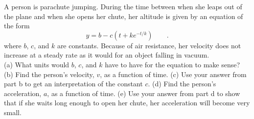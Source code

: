  A person is parachute jumping. During the
time between when she leaps out of the plane and when she
opens her chute, her altitude is given by an equation of the form
\begin{equation*}
      y = b - c\left(t+ke^{-t/k}\right) \qquad .
\end{equation*}
where  $b$, $c$, and
$k$ are constants. Because of air resistance, her velocity
does not increase at a steady rate as it would for an
object falling in vacuum.\\
(a) What units would $b$, $c$, and $k$ have to have for the
equation to make sense?\hwendpart
(b) Find the person's velocity, $v$, as a function of time.\answercheck\hwendpart
(c) Use your answer from part b to get an interpretation
of the constant $c$.\hwendpart
(d) Find the person's acceleration, $a$, as a function of time.\answercheck\hwendpart
(e) Use your answer from part d to show that if she waits
long enough to open her chute, her acceleration will become very small.
